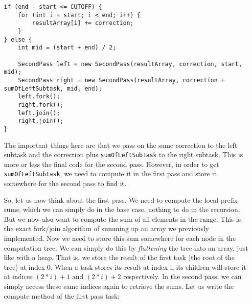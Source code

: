 \documentclass[main.tex]{subfiles}
\begin{document}
\newpage

\begin{verbatim}
if (end - start <= CUTOFF) {
    for (int i = start; i < end; i++) {
        resultArray[i] += correction;
    }
} else {
    int mid = (start + end) / 2;

    SecondPass left = new SecondPass(resultArray, correction, start, mid);
    SecondPass right = new SecondPass(resultArray, correction + sumOfLeftSubtask, mid, end);
    left.fork();
    right.fork();
    left.join();
    right.join();
}
\end{verbatim}

\noindent The important things here are that we pass on the same correction to the left subtask and the correction plus \texttt{sumOfLeftSubtask} to the right subtask. This is more or less the final code for the second pass. However, in order to get \texttt{sumOfLeftSubtask}, we need to compute it in the first pass and store it somewhere for the second pass to find it.

So, let us now think about the first pass. We need to compute the local prefix sums, which we can simply do in the base case, nothing to do in the recursion. But we now also want to compute the sum of all elements in the range. This is the exact fork/join algorithm of summing up an array we previously implemented. Now we need to store this sum somewhere for each node in the computation tree. We can simply do this by \textit{flattening} the tree into an array, just like with a heap. That is, we store the result of the first task (the root of the tree) at index 0. When a task stores its result at index i, its children will store it at indices \((2*i)+1\) and \((2*i)+2\) respectively. In the second pass, we can simply access these same indices again to retrieve the sums. Let us write the compute method of the first pass task:
\end{document}
